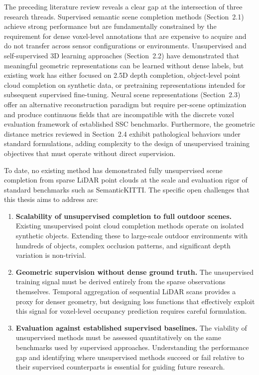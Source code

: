 \documentclass[a4paper, 12pt]{article}
\begin{document}
	The preceding literature review reveals a clear gap at the intersection of
	three research threads. Supervised semantic scene completion methods
	(Section~2.1) achieve strong performance but are fundamentally constrained by
	the requirement for dense voxel-level annotations that are expensive to
	acquire and do not transfer across sensor configurations or environments.
	Unsupervised and self-supervised 3D learning approaches (Section~2.2) have
	demonstrated that meaningful geometric representations can be learned without
	dense labels, but existing work has either focused on 2.5D depth completion,
	object-level point cloud completion on synthetic data, or pretraining
	representations intended for subsequent supervised fine-tuning. Neural scene
	representations (Section~2.3) offer an alternative reconstruction paradigm but
	require per-scene optimization and produce continuous fields that are
	incompatible with the discrete voxel evaluation framework of established SSC
	benchmarks. Furthermore, the geometric distance metrics reviewed in
	Section~2.4 exhibit pathological behaviors under standard formulations,
	adding complexity to the design of unsupervised training objectives that must
	operate without direct supervision.
	
	To date, no existing method has demonstrated fully unsupervised scene
	completion from sparse LiDAR point clouds at the scale and evaluation
	rigor of standard benchmarks such as SemanticKITTI. The specific open
	challenges that this thesis aims to address are:
	
	\begin{enumerate}
		\item \textbf{Scalability of unsupervised completion to full outdoor scenes.}
		Existing unsupervised point cloud completion methods
		\cite{10959142, lee2025unsupervisedpointcloudcompletion} operate on
		isolated synthetic objects. Extending these to large-scale outdoor
		environments with hundreds of objects, complex occlusion patterns, and
		significant depth variation is non-trivial.
		\item \textbf{Geometric supervision without dense ground truth.} The
		unsupervised training signal must be derived entirely from the sparse
		observations themselves. Temporal aggregation of sequential LiDAR scans
		\cite{9812507} provides a proxy for denser geometry, but designing loss
		functions that effectively exploit this signal for voxel-level occupancy
		prediction requires careful formulation.
		\item \textbf{Evaluation against established supervised baselines.} The
		viability of unsupervised methods must be assessed quantitatively on the
		same benchmarks used by supervised approaches. Understanding the
		performance gap and identifying where unsupervised methods succeed or
		fail relative to their supervised counterparts is essential for guiding
		future research.
	\end{enumerate}
	
\end{document}
